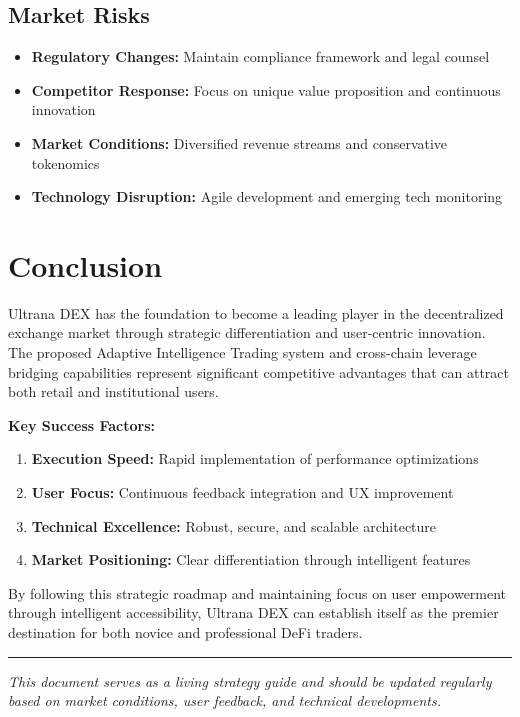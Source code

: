 \documentclass{article}
\begin{document}
\subsection{Market Risks}
\begin{itemize}[leftmargin=*]
    \item \textbf{Regulatory Changes:} Maintain compliance framework and legal counsel
    \item \textbf{Competitor Response:} Focus on unique value proposition and continuous innovation
    \item \textbf{Market Conditions:} Diversified revenue streams and conservative tokenomics
    \item \textbf{Technology Disruption:} Agile development and emerging tech monitoring
\end{itemize}

\section{Conclusion}

Ultrana DEX has the foundation to become a leading player in the decentralized exchange market through strategic differentiation and user-centric innovation. The proposed Adaptive Intelligence Trading system and cross-chain leverage bridging capabilities represent significant competitive advantages that can attract both retail and institutional users.

\textbf{Key Success Factors:}
\begin{enumerate}[leftmargin=*]
    \item \textbf{Execution Speed:} Rapid implementation of performance optimizations
    \item \textbf{User Focus:} Continuous feedback integration and UX improvement
    \item \textbf{Technical Excellence:} Robust, secure, and scalable architecture
    \item \textbf{Market Positioning:} Clear differentiation through intelligent features
\end{enumerate}

By following this strategic roadmap and maintaining focus on user empowerment through intelligent accessibility, Ultrana DEX can establish itself as the premier destination for both novice and professional DeFi traders.

\vspace{1cm}
\hrule
\vspace{0.5cm}
\textit{This document serves as a living strategy guide and should be updated regularly based on market conditions, user feedback, and technical developments.}
\end{document}
